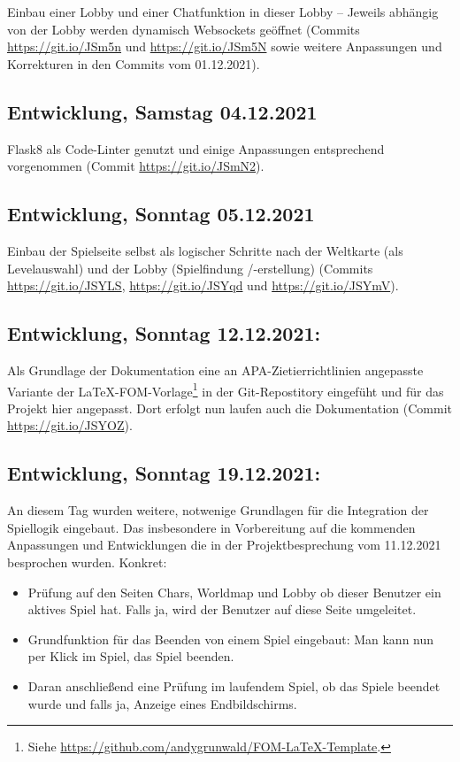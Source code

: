 Einbau einer Lobby und einer Chatfunktion in dieser Lobby -- Jeweils abhängig von der Lobby werden dynamisch Websockets geöffnet (Commits \url{https://git.io/JSm5n} und \url{https://git.io/JSm5N} sowie weitere Anpassungen und Korrekturen in den Commits vom 01.12.2021).


\subsection{Entwicklung, Samstag 04.12.2021}

Flask8 als Code-Linter genutzt und einige Anpassungen entsprechend vorgenommen (Commit \url{https://git.io/JSmN2}).


\subsection{Entwicklung, Sonntag 05.12.2021}

Einbau der Spielseite selbst als logischer Schritte nach der Weltkarte (als Levelauswahl) und der Lobby (Spielfindung /-erstellung) (Commits \url{https://git.io/JSYLS}, \url{https://git.io/JSYqd} und \url{https://git.io/JSYmV}).



\subsection{Entwicklung, Sonntag 12.12.2021:}

Als Grundlage der Dokumentation eine an APA-Zietierrichtlinien angepasste Variante der LaTeX-FOM-Vorlage\footnote{Siehe \url{https://github.com/andygrunwald/FOM-LaTeX-Template}.} in der Git-Repostitory eingefüht und für das Projekt hier angepasst. Dort erfolgt nun laufen auch die Dokumentation (Commit \url{https://git.io/JSYOZ}). 



\subsection{Entwicklung, Sonntag 19.12.2021:}

An diesem Tag wurden weitere, notwenige Grundlagen für die Integration der Spiellogik eingebaut. Das insbesondere in Vorbereitung auf die kommenden Anpassungen und Entwicklungen die in der Projektbesprechung vom 11.12.2021 besprochen wurden. 
Konkret: 

\begin{itemize}
	\item Prüfung auf den Seiten Chars, Worldmap und Lobby ob dieser Benutzer ein aktives Spiel hat. Falls ja, wird der Benutzer auf diese Seite umgeleitet.
	\item Grundfunktion für das Beenden von einem Spiel eingebaut: Man kann nun per Klick im Spiel, das Spiel beenden.
	\item Daran anschließend eine Prüfung im laufendem Spiel, ob das Spiele beendet wurde und falls ja, Anzeige eines Endbildschirms.
\end{itemize}

